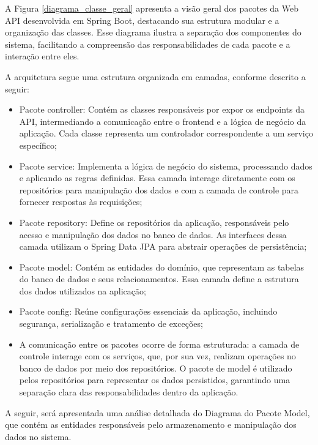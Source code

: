 \documentclass[
	12pt,				%
	oneside,			%
	a4paper,			%
	english,			%
	french,				%
	spanish,			%
	brazil				%
	]{abntex2}
\begin{document}
A Figura \ref{diagrama_classe_geral} apresenta a visão geral dos pacotes
da Web API desenvolvida em Spring Boot, destacando sua estrutura modular
e a organização das classes. Esse diagrama ilustra a separação dos
componentes do sistema, facilitando a compreensão das responsabilidades
de cada pacote e a interação entre eles.

A arquitetura segue uma estrutura organizada em camadas, conforme
descrito a seguir:

\begin{itemize}
\tightlist
\item
  Pacote controller: Contém as classes responsáveis por expor os
  endpoints da API, intermediando a comunicação entre o frontend e a
  lógica de negócio da aplicação. Cada classe representa um controlador
  correspondente a um serviço específico;
\item
  Pacote service: Implementa a lógica de negócio do sistema, processando
  dados e aplicando as regras definidas. Essa camada interage
  diretamente com os repositórios para manipulação dos dados e com a
  camada de controle para fornecer respostas às requisições;
\item
  Pacote repository: Define os repositórios da aplicação, responsáveis
  pelo acesso e manipulação dos dados no banco de dados. As interfaces
  dessa camada utilizam o Spring Data JPA para abstrair operações de
  persistência;
\item
  Pacote model: Contém as entidades do domínio, que representam as
  tabelas do banco de dados e seus relacionamentos. Essa camada define a
  estrutura dos dados utilizados na aplicação;
\item
  Pacote config: Reúne configurações essenciais da aplicação, incluindo
  segurança, serialização e tratamento de exceções;
\item
  A comunicação entre os pacotes ocorre de forma estruturada: a camada
  de controle interage com os serviços, que, por sua vez, realizam
  operações no banco de dados por meio dos repositórios. O pacote de
  model é utilizado pelos repositórios para representar os dados
  persistidos, garantindo uma separação clara das responsabilidades
  dentro da aplicação.
\end{itemize}

A seguir, será apresentada uma análise detalhada do Diagrama do Pacote
Model, que contém as entidades responsáveis pelo armazenamento e
manipulação dos dados no sistema.
\end{document}
